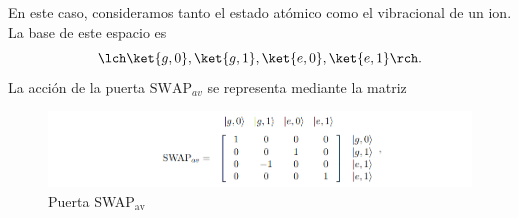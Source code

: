 
En este caso, consideramos tanto el estado atómico como el vibracional de un ion. La base de este espacio es 
	\begin{equation}
 	\lch \ket{g,0}, \ket{g,1}, \ket{e,0}, \ket{e,1} \rch.
 	\end{equation} 
La acción de la puerta $\text{SWAP}_{av}$ se representa mediante la matriz
\begin{figure}[h]
    \centering 
    \includegraphics[width=1\linewidth]{Figuras/Fig_ions_SWAPav_matrix.png}
    \caption{Puerta SWAP${}_\text{av}$}
    \label{Fig_ions_SWAPav_matrix}
\end{figure}



